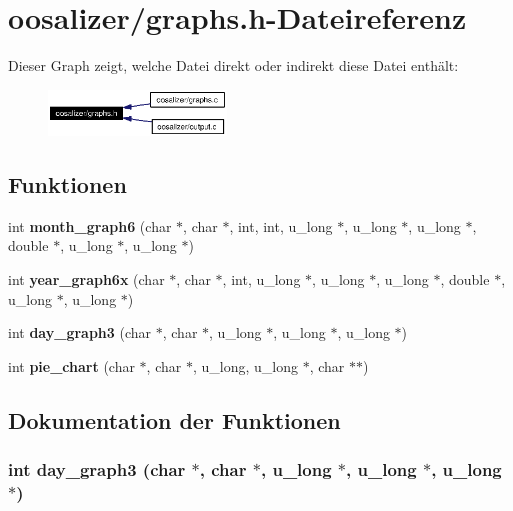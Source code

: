 \section{oosalizer/graphs.h-Dateireferenz}
\label{graphs_8h}


Dieser Graph zeigt, welche Datei direkt oder indirekt diese Datei enth\"{a}lt:\begin{figure}[H]
\begin{center}
\leavevmode
\includegraphics[width=134pt]{graphs_8h__dep__incl}
\end{center}
\end{figure}
\subsection*{Funktionen}
\begin{CompactItemize}
\item 
int {\bf month\_\-graph6} (char $\ast$, char $\ast$, int, int, u\_\-long $\ast$, u\_\-long $\ast$, u\_\-long $\ast$, double $\ast$, u\_\-long $\ast$, u\_\-long $\ast$)
\item 
int {\bf year\_\-graph6x} (char $\ast$, char $\ast$, int, u\_\-long $\ast$, u\_\-long $\ast$, u\_\-long $\ast$, double $\ast$, u\_\-long $\ast$, u\_\-long $\ast$)
\item 
int {\bf day\_\-graph3} (char $\ast$, char $\ast$, u\_\-long $\ast$, u\_\-long $\ast$, u\_\-long $\ast$)
\item 
int {\bf pie\_\-chart} (char $\ast$, char $\ast$, u\_\-long, u\_\-long $\ast$, char $\ast$$\ast$)
\end{CompactItemize}


\subsection{Dokumentation der Funktionen}
\subsubsection{\setlength{\rightskip}{0pt plus 5cm}int day\_\-graph3 (char $\ast$, char $\ast$, u\_\-long $\ast$, u\_\-long $\ast$, u\_\-long $\ast$)}\label{graphs_8h_0aac6a5e38fa2280a1fc65b1387f3bbf}


